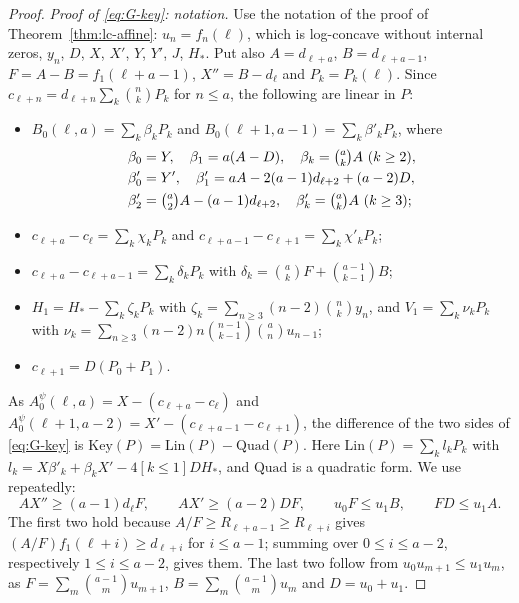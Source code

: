 \begin{proof}
\emph{Proof of \eqref{eq:G-key}: notation.} Use the notation of the proof of Theorem~\ref{thm:lc-affine}: $u_n=f_n(\ell)$, which is log-concave without internal zeros, $y_n$, $D$, $X$, $X'$, $Y$, $Y'$, $J$, $H_*$. Put also $A=d_{\ell+a}$, $B=d_{\ell+a-1}$, $F=A-B=f_1(\ell+a-1)$, $X''=B-d_\ell$ and $P_k=P_k(\ell)$. Since $c_{\ell+n}=d_{\ell+n}\sum_k\binom nkP_k$ for $n\leq a$, the following are linear in $P$:
\begin{itemize}
\item $B_0(\ell,a)=\sum_k\beta_kP_k$ and $B_0(\ell+1,a-1)=\sum_k\beta'_kP_k$, where
\[
\begin{aligned}
&\beta_0=Y,\quad\beta_1=a(A-D),\quad\beta_k=\tbinom akA\ (k\geq2),\\
&\beta'_0=Y',\quad\beta'_1=aA-2(a-1)d_{\ell+2}+(a-2)D,\\
&\beta'_2=\tbinom a2A-(a-1)d_{\ell+2},\quad\beta'_k=\tbinom akA\ (k\geq3);
\end{aligned}
\]
\item $c_{\ell+a}-c_\ell=\sum_k\chi_kP_k$ and $c_{\ell+a-1}-c_{\ell+1}=\sum_k\chi'_kP_k$;
\item $c_{\ell+a}-c_{\ell+a-1}=\sum_k\delta_kP_k$ with $\delta_k=\binom akF+\binom{a-1}{k-1}B$;
\item $H_1=H_*-\sum_k\zeta_kP_k$ with $\zeta_k=\sum_{n\geq3}(n-2)\binom nky_n$, and $V_1=\sum_k\nu_kP_k$ with $\nu_k=\sum_{n\geq3}(n-2)n\binom{n-1}{k-1}\binom anu_{n-1}$;
\item $c_{\ell+1}=D(P_0+P_1)$.
\end{itemize}
As $A^\psi_0(\ell,a)=X-(c_{\ell+a}-c_\ell)$ and $A^\psi_0(\ell+1,a-2)=X'-(c_{\ell+a-1}-c_{\ell+1})$, the difference of the two sides of \eqref{eq:G-key} is $\mathrm{Key}(P)=\mathrm{Lin}(P)-\mathrm{Quad}(P)$. Here $\mathrm{Lin}(P)=\sum_kl_kP_k$ with $l_k=X\beta'_k+\beta_kX'-4[k\leq1]DH_*$, and $\mathrm{Quad}$ is a quadratic form. We use repeatedly:
\begin{equation}\label{eq:G-basic}
AX''\geq(a-1)d_\ell F,\qquad AX'\geq(a-2)DF,\qquad u_0F\leq u_1B,\qquad FD\leq u_1A.
\end{equation}
The first two hold because $A/F\geq R_{\ell+a-1}\geq R_{\ell+i}$ gives $(A/F)f_1(\ell+i)\geq d_{\ell+i}$ for $i\leq a-1$; summing over $0\leq i\leq a-2$, respectively $1\leq i\leq a-2$, gives them. The last two follow from $u_0u_{m+1}\leq u_1u_m$, as $F=\sum_m\binom{a-1}mu_{m+1}$, $B=\sum_m\binom{a-1}mu_m$ and $D=u_0+u_1$.


\end{proof}
